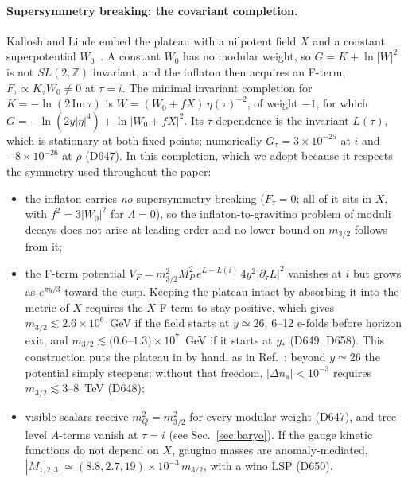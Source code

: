 \documentclass[aps,prd,twocolumn,superscriptaddress,nofootinbib,floatfix]{revtex4-2}
\begin{document}
\paragraph{Supersymmetry breaking: the covariant completion.} Kallosh and Linde embed the plateau with a nilpotent field $X$ and a constant superpotential $W_0$~\cite{arXiv_2408_05203}. A constant $W_0$ has no modular weight, so $G=K+\ln|W|^2$ is not $SL(2,\mathbb Z)$ invariant, and the inflaton then acquires an F-term, $F_\tau\propto K_\tau W_0\neq0$ at $\tau=i$. The minimal invariant completion for $K=-\ln(2\,\mathrm{Im}\,\tau)$ is $W=(W_0+fX)\,\eta(\tau)^{-2}$, of weight $-1$, for which $G=-\ln(2y|\eta|^4)+\ln|W_0+fX|^2$. Its $\tau$-dependence is the invariant $L(\tau)$, which is stationary at both fixed points; numerically $G_\tau=3\times10^{-25}$ at $i$ and $-8\times10^{-26}$ at $\rho$ (D647). In this completion, which we adopt because it respects the symmetry used throughout the paper:
\begin{itemize}
\item the inflaton carries \emph{no} supersymmetry breaking ($F_\tau=0$; all of it sits in $X$, with $f^2=3|W_0|^2$ for $\Lambda=0$), so the inflaton-to-gravitino problem of moduli decays does not arise at leading order and no lower bound on $m_{3/2}$ follows from it;
\item the F-term potential $V_F=m_{3/2}^2M_P^2\,e^{L-L(i)}\,4y^2|\partial_\tau L|^2$ vanishes at $i$ but grows as $e^{\pi y/3}$ toward the cusp. Keeping the plateau intact by absorbing it into the metric of $X$ requires the $X$ F-term to stay positive, which gives $m_{3/2}\lesssim2.6\times10^6$~GeV if the field starts at $y\simeq26$, 6--12 e-folds before horizon exit, and $m_{3/2}\lesssim(0.6$--$1.3)\times10^7$~GeV if it starts at $y_*$ (D649, D658). This construction puts the plateau in by hand, as in Ref.~\cite{arXiv_2408_05203}; beyond $y\simeq26$ the potential simply steepens; without that freedom, $|\Delta n_s|<10^{-3}$ requires $m_{3/2}\lesssim3$--$8$~TeV (D648);
\item visible scalars receive $m_Q^2=m_{3/2}^2$ for every modular weight (D647), and tree-level $A$-terms vanish at $\tau=i$ (see Sec.~\ref{sec:baryo}). If the gauge kinetic functions do not depend on $X$, gaugino masses are anomaly-mediated, $|M_{1,2,3}|\simeq(8.8,2.7,19)\times10^{-3}\,m_{3/2}$, with a wino LSP (D650).
\end{itemize}
\end{document}
